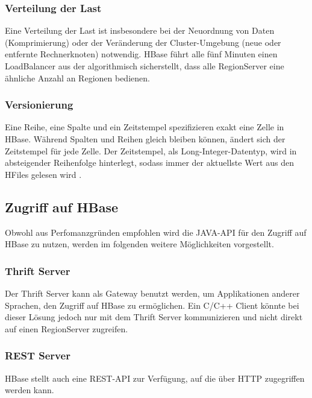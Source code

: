 \subsubsection{Verteilung der Last}
Eine Verteilung der Last ist insbesondere bei der Neuordnung von Daten (Komprimierung) oder der Veränderung der Cluster-Umgebung (neue oder entfernte Rechnerknoten) notwendig.
HBase führt alle fünf Minuten einen LoadBalancer aus der algorithmisch sicherstellt, dass alle RegionServer eine ähnliche Anzahl an Regionen bedienen. 

 \subsubsection{Versionierung}
Eine Reihe, eine Spalte und ein Zeitstempel spezifizieren exakt eine Zelle in HBase. Während Spalten und Reihen gleich bleiben können, ändert sich der Zeitstempel für jede Zelle. Der Zeitstempel, als Long-Integer-Datentyp, wird in absteigender Reihenfolge hinterlegt, sodass immer der aktuellste Wert aus den HFiles gelesen wird \cite{reference}.


\subsection{Zugriff auf HBase}
Obwohl aus Perfomanzgründen empfohlen wird die JAVA-API für den Zugriff auf HBase zu nutzen, werden im folgenden weitere Möglichkeiten vorgestellt.

\subsubsection{Thrift Server}
Der Thrift Server kann als Gateway benutzt werden, um Applikationen  anderer Sprachen, den Zugriff auf HBase zu ermöglichen. Ein C/C++ Client könnte bei dieser Lösung jedoch nur mit dem Thrift Server kommunizieren und nicht direkt auf einen RegionServer zugreifen.

\subsubsection{REST Server}
HBase stellt auch eine REST-API zur Verfügung, auf die über HTTP zugegriffen werden kann.



